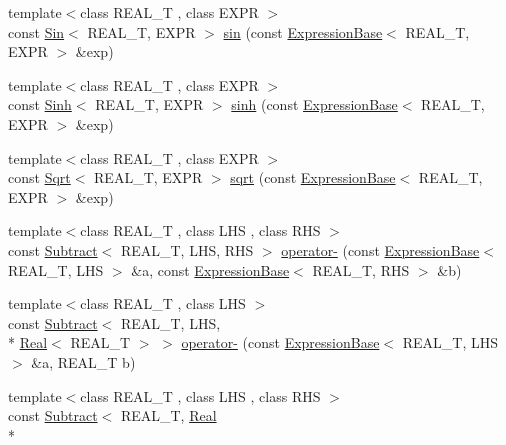 \begin{DoxyCompactItemize}
\item 
{\footnotesize template$<$class R\+E\+A\+L\+\_\+\+T , class E\+X\+P\+R $>$ }\\const \hyperlink{structatl_1_1_sin}{Sin}$<$ R\+E\+A\+L\+\_\+\+T, E\+X\+P\+R $>$ \hyperlink{namespaceatl_a44ce38b9b0532d6566c54530dbd72762}{sin} (const \hyperlink{structatl_1_1_expression_base}{Expression\+Base}$<$ R\+E\+A\+L\+\_\+\+T, E\+X\+P\+R $>$ \&exp)
\item 
{\footnotesize template$<$class R\+E\+A\+L\+\_\+\+T , class E\+X\+P\+R $>$ }\\const \hyperlink{structatl_1_1_sinh}{Sinh}$<$ R\+E\+A\+L\+\_\+\+T, E\+X\+P\+R $>$ \hyperlink{namespaceatl_ab841e557045547c65bfd1d558185c1cf}{sinh} (const \hyperlink{structatl_1_1_expression_base}{Expression\+Base}$<$ R\+E\+A\+L\+\_\+\+T, E\+X\+P\+R $>$ \&exp)
\item 
{\footnotesize template$<$class R\+E\+A\+L\+\_\+\+T , class E\+X\+P\+R $>$ }\\const \hyperlink{structatl_1_1_sqrt}{Sqrt}$<$ R\+E\+A\+L\+\_\+\+T, E\+X\+P\+R $>$ \hyperlink{namespaceatl_a7d3b11bf11a6715b1c7ecbb028931d3b}{sqrt} (const \hyperlink{structatl_1_1_expression_base}{Expression\+Base}$<$ R\+E\+A\+L\+\_\+\+T, E\+X\+P\+R $>$ \&exp)
\item 
{\footnotesize template$<$class R\+E\+A\+L\+\_\+\+T , class L\+H\+S , class R\+H\+S $>$ }\\const \hyperlink{structatl_1_1_subtract}{Subtract}$<$ R\+E\+A\+L\+\_\+\+T, L\+H\+S, R\+H\+S $>$ \hyperlink{namespaceatl_afc0c607fc379e7cb732e61d69e008acb}{operator-\/} (const \hyperlink{structatl_1_1_expression_base}{Expression\+Base}$<$ R\+E\+A\+L\+\_\+\+T, L\+H\+S $>$ \&a, const \hyperlink{structatl_1_1_expression_base}{Expression\+Base}$<$ R\+E\+A\+L\+\_\+\+T, R\+H\+S $>$ \&b)
\item 
{\footnotesize template$<$class R\+E\+A\+L\+\_\+\+T , class L\+H\+S $>$ }\\const \hyperlink{structatl_1_1_subtract}{Subtract}$<$ R\+E\+A\+L\+\_\+\+T, L\+H\+S, \\*
\hyperlink{structatl_1_1_real}{Real}$<$ R\+E\+A\+L\+\_\+\+T $>$ $>$ \hyperlink{namespaceatl_a01ed5cafe06da2f65343e08a576bdd03}{operator-\/} (const \hyperlink{structatl_1_1_expression_base}{Expression\+Base}$<$ R\+E\+A\+L\+\_\+\+T, L\+H\+S $>$ \&a, R\+E\+A\+L\+\_\+\+T b)
\item 
{\footnotesize template$<$class R\+E\+A\+L\+\_\+\+T , class L\+H\+S , class R\+H\+S $>$ }\\const \hyperlink{structatl_1_1_subtract}{Subtract}$<$ R\+E\+A\+L\+\_\+\+T, \hyperlink{structatl_1_1_real}{Real}\\*

\end{DoxyCompactItemize}
